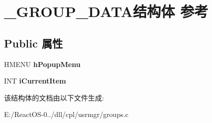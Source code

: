 \hypertarget{struct___g_r_o_u_p___d_a_t_a}{}\section{\+\_\+\+G\+R\+O\+U\+P\+\_\+\+D\+A\+T\+A结构体 参考}
\label{struct___g_r_o_u_p___d_a_t_a}
\subsection*{Public 属性}
\begin{DoxyCompactItemize}
\item 
\mbox{\label{struct___g_r_o_u_p___d_a_t_a_a6b818a721301a7897b0c339f7199f538}} 
H\+M\+E\+NU {\bfseries h\+Popup\+Menu}
\item 
\mbox{\label{struct___g_r_o_u_p___d_a_t_a_a299174fd6b2891b2805070b92cf7ed17}} 
I\+NT {\bfseries i\+Current\+Item}
\end{DoxyCompactItemize}


该结构体的文档由以下文件生成\+:\begin{DoxyCompactItemize}
\item 
E\+:/\+React\+O\+S-\/0../dll/cpl/usrmgr/groups.\+c\end{DoxyCompactItemize}
